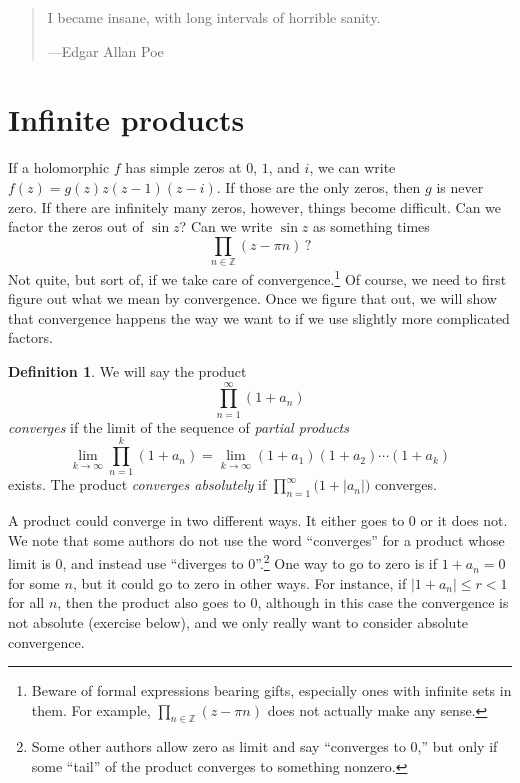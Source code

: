 \documentclass[12pt,openany]{book}
\newcommand{\glsadd}[2][]{}
\newcommand{\sabs}[1]{\lvert {#1} \rvert}
\newcommand{\Z}{{\mathbb{Z}}}
\newcommand{\myindex}[1]{#1\index{#1}}
\newcommand{\myquote}[1]{``#1''}
\theoremstyle{plain}
\theoremstyle{remark}
\theoremstyle{definition}
\newtheorem{defn}[thm]{Definition}
\newenvironment{myepigraph}{%
    \begin{quote}%
    \begingroup\itshape
}{%
    \endgroup%
    \end{quote}
}
\theoremstyle{exercise}
\theoremstyle{example}
\begin{document}
\begin{myepigraph}
I became insane, with long intervals of horrible sanity.

---Edgar Allan Poe
\end{myepigraph}


\section{Infinite products}
\label{sec:prod}

If a
holomorphic $f$
has simple zeros at $0$, $1$, and $i$, we
can write
$f(z) = g(z) z(z-1)(z-i)$.  If those are the only zeros, then 
$g$ is never zero.  If there are infinitely many zeros, however,
things become difficult.
Can we factor the zeros out of $\sin z$?  Can we
write $\sin z$ as something times
\begin{equation*}
\prod_{n \in \Z} (z-\pi n) \, ?
\end{equation*}
Not quite, but sort of, if
we take care of convergence.\footnote{Beware of
formal expressions bearing gifts,
especially ones with infinite sets in them.
For example, $\prod_{n \in \Z} (z-\pi n)$ does not actually make any sense.}
Of course, we need to first
figure out what we mean by convergence.  Once we figure that out,
we will show that convergence happens the way we want to
if we use slightly more complicated factors.

\begin{defn}
We will say the product
\glsadd{not:infprod}%
\begin{equation*}
\prod_{n=1}^\infty (1+a_n)
\end{equation*}
\emph{converges} if the limit of the
sequence of \emph{\myindex{partial products}}
\begin{equation*}
\lim_{k\to \infty}
\prod_{n=1}^k (1+a_n) =
\lim_{k\to \infty}
(1+a_1)(1+a_2) \cdots (1+a_k)
\end{equation*}
exists.
The product
\emph{converges absolutely}%
%
if $\prod_{n=1}^\infty \bigl(1+\sabs{a_n}\bigr)$
converges.
\end{defn}

A product could converge in two different ways.  It either goes to $0$ or it
does not.
We note that some authors do not use the word \myquote{converges} for a product whose
limit is $0$, and instead use
\myquote{diverges to $0$}.\footnote{%
Some other authors allow zero as limit and say \myquote{converges to $0$,} but only if
some
\myquote{tail} of the product converges to something nonzero.}
One way to go to zero is if $1+a_n=0$ for some $n$, but it could
go to zero in other ways.  For instance, if $\sabs{1+a_n} \leq r < 1$ for all
$n$, then the product also goes to $0$, although in this case the
convergence is not absolute (exercise below),
and we only really want to consider absolute convergence.
\end{document}
